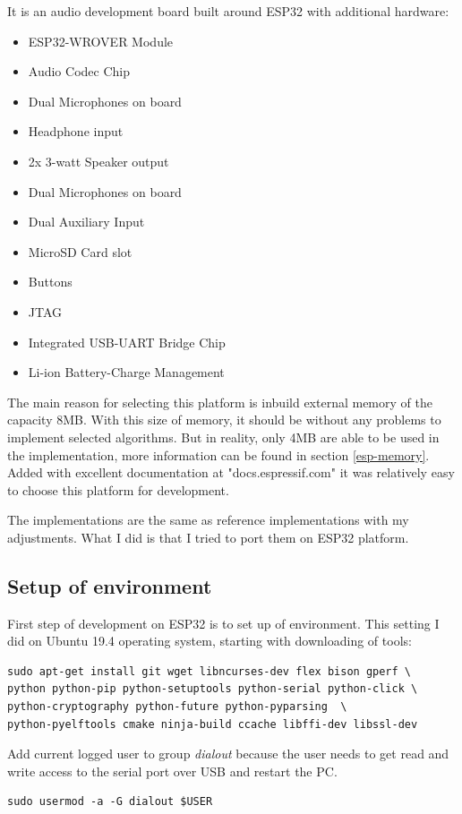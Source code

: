 \documentclass[thesis=M,english]{FITthesis}[2019/12/23]
\begin{document}
It is an audio development board built around ESP32 with additional hardware:
\begin{itemize}
\item	ESP32-WROVER Module
\item	Audio Codec Chip
\item	Dual Microphones on board
\item	Headphone input
\item	2x 3-watt Speaker output
\item	Dual Microphones on board
\item	Dual Auxiliary Input
\item	MicroSD Card slot
\item	Buttons
\item	JTAG
\item	Integrated USB-UART Bridge Chip
\item	Li-ion Battery-Charge Management
\end{itemize}

The main reason for selecting this platform is inbuild external memory of the capacity 8MB. With this size of memory, it should be without any problems to implement selected algorithms. But in reality, only 4MB are able to be used in the implementation, more information can be found in section \ref{esp-memory}. Added with excellent documentation at "docs.espressif.com" it was relatively easy to choose this platform for development.

\bigskip
\noindent
The implementations are the same as reference implementations with my adjustments. What I did is that I tried to port them on ESP32 platform.

\subsection{Setup of environment}
First step of development on ESP32 is to set up of environment. This setting I did on Ubuntu 19.4 operating system, starting with downloading of tools:
\begin{lstlisting}[frame=single]
sudo apt-get install git wget libncurses-dev flex bison gperf \
python python-pip python-setuptools python-serial python-click \
python-cryptography python-future python-pyparsing  \
python-pyelftools cmake ninja-build ccache libffi-dev libssl-dev
\end{lstlisting}

\bigskip
\noindent
Add current logged user to group \textit{dialout} because the user needs to get read and write access to the serial port over USB and restart the PC.
\begin{lstlisting}[frame=single]
sudo usermod -a -G dialout $USER
\end{lstlisting}
\end{document}

